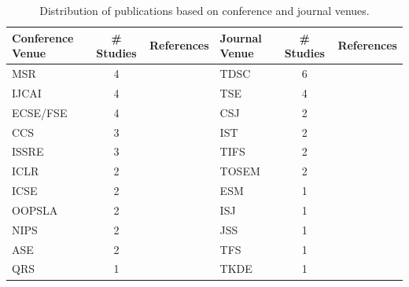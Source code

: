 
\begin{table}[h]
\caption{Distribution of publications based on conference and journal venues.}
\setlength\tabcolsep{2.0pt}
\begin{tabular}{lcclcc}
\toprule
Conference Venue & \# Studies & References & Journal Venue         & \# Studies & References \\
\midrule
MSR   & 4          &  \cite{chen2020machine, hoang2019deepjit, hin2022linevd, fu2022linevul}    & TDSC & 6  &   \cite{liu2020cd, zou2019mu, lin2019software, li2021sysevr, li2021vuldeelocator, zou2022mvulpreter}         \\
IJCAI            & 4          &    \cite{3172102, zhuang2020smart, duan2019vulsniper, liu2021smart}        & TSE & 4            &     \cite{dam2018automatic, dam2017automatic, chen2021neural, scandariato2014predicting}       \\
ECSE/FSE         & 4          &   \cite{zhou2017automated, li2021vulnerability, ni2022best, nguyen2022mando}      & CSJ & 2 &      \cite{jeon2021autovas, yan2021han}      \\
CCS              & 3          &       \cite{yamaguchi2013chucky, lin2017poster, perl2015vccfinder, cheng2019static}      & IST   & 2   &   \cite{shippey2019automatically, tian2020bvdetector}         \\
 ISSRE            & 3          &     \cite{zheng2021vulspg, wu2021peculiar, zeng2021gcn2defect}           & TIFS    & 2 &    \cite{wang2020combining, huang2021hunting}        \\
ICLR             & 2          &    \cite{dinella2020hoppity, le2018maximal}        & TOSEM & 2 &   \cite{cheng2021deepwukong, 3429444}         \\
ICSE             & 2          &   \cite{cao2022mvd, wang2016automatically}          & ESM  & 1 &    \cite{riom2021revisiting}        \\
OOPSLA           & 2          &    \cite{pradel2018deepbugs, 3360588}        & ISJ  & 1  & \cite{ghaffarian2021neural}   \\
NIPS             & 2          &         \cite{3327890, zhou2019devign}   & JSS  & 1  &  \cite{pascarella2019fine}          \\
  ASE         & 2          &      \cite{le2021deepcva, zhang2022reentrancy}      & TFS & 1  &  \cite{liu2019deepbalance} \\
QRS              & 1          &        \cite{li2017software}    & TKDE   & 1   &   \cite{liu2021combining}         \\

\end{tabular}
\end{table}
